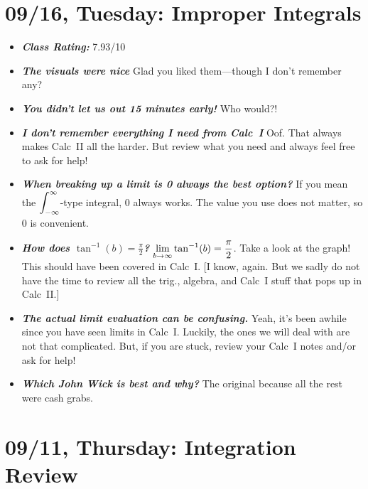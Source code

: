 \documentclass[11pt,letterpaper]{article}
\begin{document}
\newpage
\section*{09/16, Tuesday: Improper Integrals\label{09-16}}

\begin{itemize}
\item {\bfseries\itshape Class Rating:} 7.93/10
\item {\bfseries\itshape The visuals were nice} Glad you liked them---though I don't remember any?

\item {\bfseries\itshape You didn't let us out 15 minutes early!} Who would?!

\item {\bfseries\itshape I don't remember everything I need from Calc~I} Oof. That always makes Calc~II all the harder. But review what you need and always feel free to ask for help!

\item {\bfseries\itshape When breaking up a limit is 0 always the best option?} If you mean the $\displaystyle\int_{-\infty}^\infty$-type integral, 0 always works. The value you use does not matter, so 0 is convenient. 

\item {\bfseries\itshape How does $\tan^{-1}(b)= \frac{\pi}{2}$?} $\displaystyle\lim_{b \to \infty} \tan^{-1}(b)= \frac{\pi}{2}$. Take a look at the graph! This should have been covered in Calc~I. [I know, again. But we sadly do not have the time to review all the trig., algebra, and Calc~I stuff that pops up in Calc~II.]

\item {\bfseries\itshape The actual limit evaluation can be confusing.} Yeah, it's been awhile since you have seen limits in Calc~I. Luckily, the ones we will deal with are not that complicated. But, if you are stuck, review your Calc~I notes and/or ask for help!

\item {\bfseries\itshape Which John Wick is best and why?} The original because all the rest were cash grabs.
\end{itemize}

\newpage
\section*{09/11, Thursday: Integration Review\label{09-11}}
\end{document}
